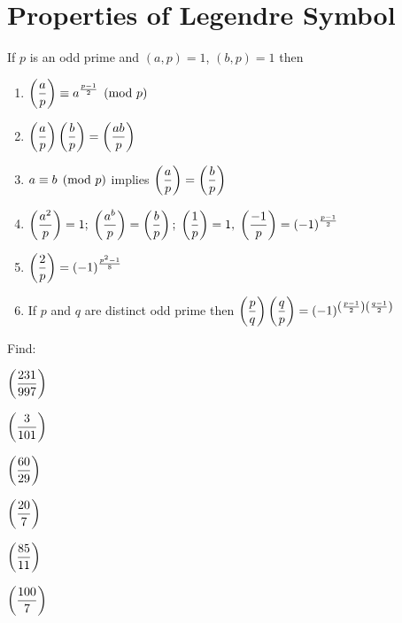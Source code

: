 \documentclass[12pt,class=book,crop=false]{standalone}
\begin{document}
\section*{Properties of Legendre Symbol}
\begin{thm}
    If $ p $ is an odd prime and $ (a,p)=1 $, $ (b,p)=1 $ then
    \begin{enumerate}[label=(\roman*)]
        \item $ \displaystyle \left( \frac{a}{p} \right)\equiv a^{\frac{p-1}{2}} \pmod{p} $
        \item $ \displaystyle \left( \frac{a}{p} \right)\left( \frac{b}{p} \right)=\left( \frac{ab}{p} \right)$
        \item $ a\equiv b \pmod{p} $ implies $ \displaystyle \left( \frac{a}{p} \right)=\left( \frac{b}{p} \right)$
        \item $ \displaystyle \left( \frac{a^2}{p} \right)=1;\;\left( \frac{a^b}{p} \right)=\left( \frac{b}{p} \right);\;\left( \frac{1}{p} \right)=1,\;\left( \frac{-1}{p} \right)=(-1)^{\frac{p-1}{2}}$
        \item $ \displaystyle \left( \frac{2}{p} \right)=(-1)^{\frac{p^2-1}{8}}$
        \item If $ p $ and $ q $ are distinct odd prime then $ \displaystyle \left( \frac{p}{q} \right)\left( \frac{q}{p} \right)=(-1)^{\left( \frac{p-1}{2} \right)\left( \frac{q-1}{2} \right)}$
    \end{enumerate}
\end{thm}
\begin{qn}
    Find:
    \begin{enumerate*}
        \item $ \displaystyle \left( \frac{231}{997} \right) $
        \item $ \displaystyle \left( \frac{3}{101} \right) $
        \item $ \displaystyle \left( \frac{60}{29} \right) $
        \item $ \displaystyle \left( \frac{20}{7} \right) $
        \item $ \displaystyle \left( \frac{85}{11} \right) $
        \item $ \displaystyle \left( \frac{100}{7} \right) $
    \end{enumerate*}
\end{qn}
\end{document}
